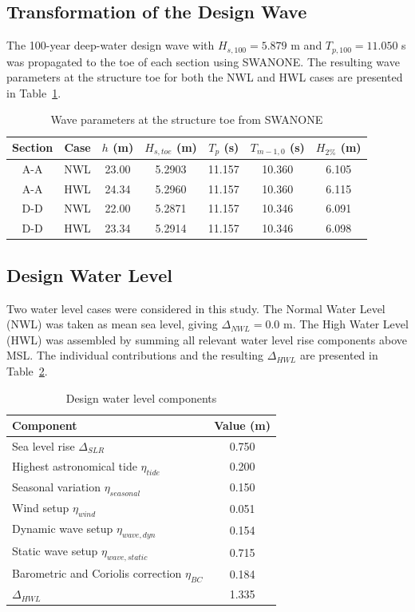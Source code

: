 \documentclass[a4paper, 11pt]{article}
\begin{document}
\subsection{Transformation of the Design Wave}
\hspace{0.5cm}The 100-year deep-water design wave with $H_{s,100} = 5.879$ m and $T_{p,100} = 11.050$ s was propagated to the toe of each section using SWANONE. The resulting wave parameters at the structure toe for both the NWL and HWL cases are presented in Table~\ref{tab:swanone}.

\begin{table}[H]
\centering
\caption{Wave parameters at the structure toe from SWANONE}
\label{tab:swanone}
\begin{tabular}{ccccccc}
\hline
Section & Case & $h$ (m) & $H_{s,toe}$ (m) & $T_{p}$ (s) & $T_{m-1,0}$ (s) & $H_{2\%}$ (m) \\
\hline
A-A & NWL & 23.00 & 5.2903 & 11.157 & 10.360 & 6.105 \\
A-A & HWL & 24.34 & 5.2960 & 11.157 & 10.360 & 6.115 \\
D-D & NWL & 22.00 & 5.2871 & 11.157 & 10.346 & 6.091 \\
D-D & HWL & 23.34 & 5.2914 & 11.157 & 10.346 & 6.098 \\
\hline
\end{tabular}
\end{table}

\subsection{Design Water Level}
\hspace{0.5cm}Two water level cases were considered in this study. The Normal Water Level (NWL) was taken as mean sea level, giving $\Delta_{NWL} = 0.0$ m. The High Water Level (HWL) was assembled by summing all relevant water level rise components above MSL. The individual contributions and the resulting $\Delta_{HWL}$ are presented in Table~\ref{tab:dwl}.

\begin{table}[H]
\centering
\caption{Design water level components}
\label{tab:dwl}
\begin{tabular}{lc}
\hline
Component & Value (m) \\
\hline
Sea level rise $\Delta_{SLR}$ & 0.750 \\
Highest astronomical tide $\eta_{tide}$ & 0.200 \\
Seasonal variation $\eta_{seasonal}$ & 0.150 \\
Wind setup $\eta_{wind}$ & 0.051 \\
Dynamic wave setup $\eta_{wave,dyn}$ & 0.154 \\
Static wave setup $\eta_{wave,static}$ & 0.715 \\
Barometric and Coriolis correction $\eta_{BC}$ & 0.184 \\
\hline
$\Delta_{HWL}$ & 1.335 \\
\hline
\end{tabular}
\end{table}
\end{document}
